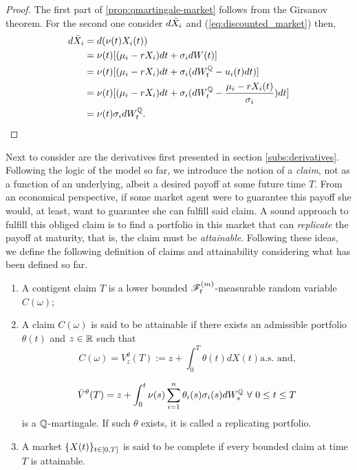 \documentclass[../TGMAFFIRO.tex]{subfiles}
\begin{document}
\begin{proof}
	The first part of \ref{prop:qmartingale-market} follows from the Girsanov theorem. For the second one consider $d\bar{X}_i$ and (\ref{eq:discounted_market}) then,
	\begin{align*}
		d\bar{X}_i &= d(\nu(t)X_i(t)) \\
		&= \nu(t)[(\mu_i - r X_i)dt + \sigma_i dW(t)]\\
		&= \nu(t)[(\mu_i - r X_i)dt + \sigma_i (dW^{\mathbb{Q}}_t - u_i(t)dt)]\\
		&= \nu(t)[(\mu_i - r X_i)dt + \sigma_i (dW^{\mathbb{Q}}_t - \frac{\mu_i - r X_i(t)}{\sigma_i})dt]\\
		&= \nu(t)\sigma_idW^{\mathbb{Q}}_t.
	\end{align*}
\end{proof}

Next to consider are the derivatives first presented in section \ref{subs:derivatives}. Following the logic of the model so far, we introduce the notion of a \textit{claim}, not as a function of an underlying, albeit a desired payoff at some future time $T$. From an economical perspective, if some market agent were to guarantee this payoff she would, at least, want to guarantee she can fulfill said claim. A sound approach to fulfill this obliged claim is to find a portfolio in this market that can \textit{replicate} the payoff at maturity, that is, the claim must be \textit{attainable}. Following these ideas, we define the following definition of claims and attainability considering what has been defined so far.

\begin{definition}\label{def:claim-attainability}
\begin{enumerate}
	\item A contigent claim $T$ is a lower bounded $\mathscr{F}_t^{(m)}$-measurable random variable $C(\omega)$;
	\item A claim $C(\omega)$ is said to be attainable if there exists an admissible portfolio $\theta(t)$ and $z\in\mathbb{R}$ such that
	\[
		C(\omega) = V_z^{\theta}(T) := z + \int_0^T \theta(t)dX(t) \text{a.s. and,}
	\]
	
	\begin{equation}
		\bar{V}^\theta(T)	 = z + \int_0^t \nu(s)\sum_{i=1}^{n}\theta_i(s)\sigma_i(s) dW^{\mathbb{Q}}_s \ \forall \ 0 \leq t \leq T
	\end{equation} 
	is a $\mathbb{Q}$-martingale. If such $\theta$ exists, it is called a replicating portfolio.
	\item A market $\{X(t)\}_{t\in[0,T]}$ is said to be complete if every bounded claim at time $T$ is attainable.
\end{enumerate}
\end{definition}
\end{document}
